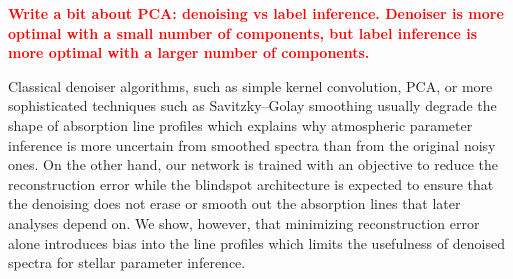 \documentclass[twocolumn]{aastex7}
\newcommand{\ld}[1]{\textcolor{red}{\textbf{#1}}}
\newcounter{algorithm}
\begin{document}
\ld{Write a bit about PCA: denoising vs label inference. Denoiser is more optimal with a small number of components, but label inference is more optimal with a larger number of components.}

Classical denoiser algorithms, such as simple kernel convolution, PCA, or more sophisticated techniques such as Savitzky--Golay smoothing usually degrade the shape of absorption line profiles which explains why atmospheric parameter inference is more uncertain from smoothed spectra than from the original noisy ones. On the other hand, our network is trained with an objective to reduce the reconstruction error while the blindspot architecture is expected to ensure that the denoising does not erase or smooth out the absorption lines that later analyses depend on. We show, however, that minimizing reconstruction error alone introduces bias into the line profiles which limits the usefulness of denoised spectra for stellar parameter inference.
\end{document}
